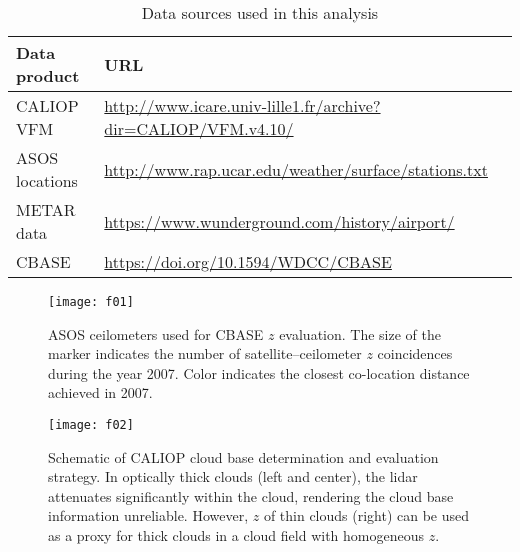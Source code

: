 \documentclass[essd,manuscript]{copernicus}
\begin{document}



\clearpage

\begin{table}
  \centering
  \caption{Data sources used in this analysis}
  \begin{tabular}{ll}
    \hline\hline
    Data product & URL  \\\hline
    CALIOP VFM & \url{http://www.icare.univ-lille1.fr/archive?dir=CALIOP/VFM.v4.10/} \\
    ASOS locations & \url{http://www.rap.ucar.edu/weather/surface/stations.txt}\\
    METAR data & \url{https://www.wunderground.com/history/airport/}\footnotemark[1] \\
    CBASE & \url{https://doi.org/10.1594/WDCC/CBASE} \\
    \hline\hline
  \end{tabular}
  \label{tab:data}
\end{table}
\begin{figure}
{\centering \texttt{[image: f01]} 

}
  \caption{ASOS ceilometers used for CBASE \ensuremath{z}{} evaluation.  The size of the
    marker indicates the number of satellite--ceilometer \ensuremath{z}{} coincidences during
    the year 2007.  Color indicates the closest co-location distance achieved in
    2007.}
  \label{fig:asos}
\end{figure}

\begin{figure}
  \centering
  \texttt{[image: f02]}
  \caption{Schematic of CALIOP cloud base determination and evaluation strategy.
    In optically thick clouds (left and center), the lidar attenuates
    significantly within the cloud, rendering the cloud base information
    unreliable.  However, \ensuremath{z}{} of thin clouds (right) can be used as a proxy
    for thick clouds in a cloud field with homogeneous \ensuremath{z}{}.}
  \label{fig:method}
\end{figure}
\end{document}
